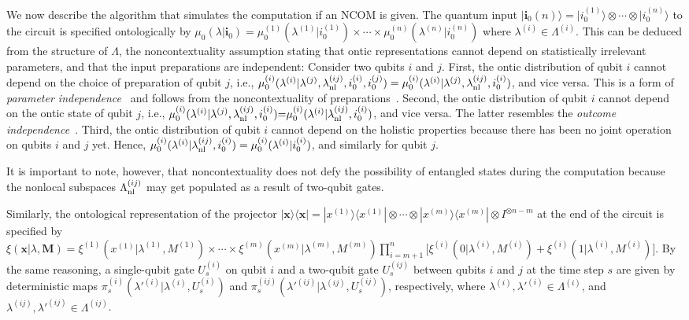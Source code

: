 \documentclass[prl,twocolumn,amsmath,amssymb,nofootinbib]{revtex4-1}
\newcommand\s[1]{_{\rm #1}}
\newcommand\us[1]{^{(#1)}}
\renewcommand{\ket}[1] {| #1 \rangle}
\newcommand{\ketbra}[1]{ | #1 \rangle\!\langle #1 |}
\begin{document}
We now describe the algorithm that simulates the computation if an NCOM is given.
The quantum input $\ket{\mathbf{i}_0(n)}{=}\ket{i_0\us{1}}{\otimes}{\cdots}{\otimes}\ket{i_0\us{n}}$ to the circuit is specified ontologically by $\mu_0(\lambda|\mathbf{i}_0) {=} \mu_0\us{1}(\lambda^{(1)}|i_0\us{1}) {\times} \cdots {\times} \mu_0^{(n)}(\lambda^{(n)}|i_0\us{n})$ where $\lambda^{(i)}{\in}\Lambda^{(i)}$.
This can be deduced from the structure of $\Lambda$, the noncontextuality assumption stating that ontic representations cannot depend on statistically irrelevant parameters, and that the input preparations are independent:
Consider two qubits $i$ and $j$.
First, the ontic distribution of qubit $i$ cannot depend on the choice of preparation of qubit $j$, i.e., $\mu_0\us{i}(\lambda^{(i)}|\lambda^{(j)},\lambda^{(ij)}\s{nl},i_0\us{i},i_0\us{j})=\mu_0\us{i}(\lambda^{(i)}|\lambda^{(j)},\lambda^{(ij)}\s{nl},i_0\us{i})$, and vice versa.
This is a form of \textit{parameter independence}~\cite{Emerson2013} and follows from the noncontextuality of preparations~\cite{SpekkensTalk_pirsa2012}.
Second, the ontic distribution of qubit $i$ cannot depend on the ontic state of qubit $j$, i.e., $\mu_0\us{i}(\lambda^{(i)}|\lambda^{(j)},\lambda^{(ij)}\s{nl},i_0\us{i}) {=} \mu_0\us{i}(\lambda^{(i)}|\lambda^{(ij)}\s{nl},i_0\us{i})$, and vice versa.
The latter resembles the \textit{outcome independence}~\cite{Emerson2013}.
Third, the ontic distribution of qubit $i$ cannot depend on the holistic properties because there has been no joint operation on qubits $i$ and $j$ yet.
Hence, $\mu_0\us{i}(\lambda^{(i)}|\lambda^{(ij)}\s{nl},i_0\us{i})=\mu_0\us{i}(\lambda^{(i)}|i_0\us{i})$, and similarly for qubit $j$.

It is important to note, however, that noncontextuality does not defy the possibility of entangled states during the computation because the nonlocal subspaces $\Lambda^{(ij)}\s{nl}$ may get populated as a result of two-qubit gates.

Similarly, the ontological representation of the projector $\ketbra{\mathbf{x}} = \ketbra{x\us{1}} \otimes \cdots \otimes \ketbra{x\us{m}} \otimes I^{\otimes n-m}$ at the end of the circuit is specified by $\xi(\mathbf{x}|\lambda,\mathbf{M})=\xi^{(1)}(x\us{1}|\lambda^{(1)},M\us{1})\times\cdots\times \xi^{(m)}(x\us{m}|\lambda^{(m)},M\us{m})\prod_{i=m+1}^{n} \big[\xi^{(i)}(0|\lambda^{(i)},M\us{i}) + \xi^{(i)}(1|\lambda^{(i)},M\us{i})\big]$. 
By the same reasoning, a single-qubit gate $U_s^{(i)}$ on qubit $i$ and a two-qubit gate $U_s^{(ij)}$ between qubits $i$ and $j$ at the time step $s$ are given by deterministic maps $\pi_s^{(i)}(\lambda'^{(i)}|\lambda^{(i)},U_s^{(i)})$ and $\pi_s^{(ij)}(\lambda'^{(ij)}|\lambda^{(ij)},U_s^{(ij)})$, respectively, where $\lambda^{(i)},\lambda'^{(i)}\in\Lambda^{(i)}$, and $\lambda^{(ij)},\lambda'^{(ij)}\in\Lambda^{(ij)}$.
\end{document}
